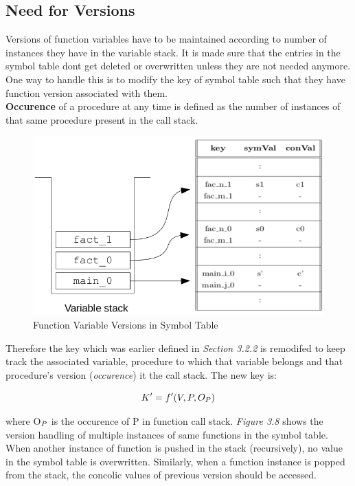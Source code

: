 \documentclass[12pt,oneside]{book}
\begin{document}
\subsection{Need for Versions}
Versions of function variables have to be maintained according to number of instances they have in the variable stack. It is made sure that the entries in the symbol table dont get deleted or overwritten unless they are not needed anymore. One way to handle this is to modify the key of symbol table such that they have function version associated with them. \\
\textbf{Occurence} of a procedure at any time is defined as the number of instances of that same procedure present in the call stack.\\

\vspace{0.4cm}
\begin{figure}[htbp]
\centering
\includegraphics[scale=0.50]{symtableandstack.png}
\caption{Function Variable Versions in Symbol Table}
\end{figure}
Therefore the key which was earlier defined in \textit{Section 3.2.2} is remodifed to keep track the associated variable, procedure to which that variable belongs and that procedure's version (\textit{occurence}) it the call stack. The new key is:

\begin{equation}
K' = f'(V,P,O_{\tiny{P}})
\end{equation}

where O$_{\tiny{P}}$ is the occurence of P in function call stack.
\textit{Figure 3.8} shows the version handling of multiple instances of same functions in the symbol table. When another instance of function is pushed in the stack (recursively), no value in the symbol table is overwritten. Similarly, when a function instance is popped from the stack, the concolic values of previous version should be accessed.
\end{document}
